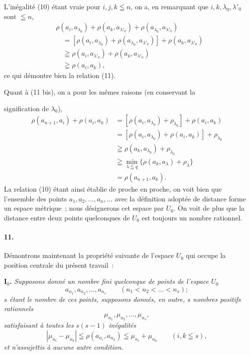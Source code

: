 \documentclass[a4paper,12pt]{amsart}
\newcommand{\srcpage}[1]{} %
\begin{document}
L'inégalité (10) étant vraie pour $i,j,k\leqq n$, on a, en remarquant que $i,k,\lambda_0,\lambda'_0$ sont $\leqq n$,
\begin{equation}\tag{13}
\begin{aligned}
&\rho(a_i,a_{\lambda_0})+\rho(a_k,a_{\lambda'_0})+\rho(a_{\lambda_0},a_{\lambda'_0})\\
&\quad=[\rho(a_i,a_{\lambda_0})+\rho(a_{\lambda_0},a_{\lambda'_0})]+\rho(a_k,a_{\lambda'_0})\\
&\quad\geqq\rho(a_i,a_{\lambda'_0})+\rho(a_k,a_{\lambda'_0})\\
&\quad\geqq\rho(a_i,a_k),
\end{aligned}
\end{equation}
ce qui démontre bien la relation (11).

Quant à (11 bis), on a pour les mêmes raisons (en conservant la
\srcpage{56}
signification de $\lambda_0$),
\[
\begin{aligned}
\rho(a_{n+1},a_i)+\rho(a_i,a_k)
&=[\rho(a_i,a_{\lambda_0})+\rho_{\lambda_0}]+\rho(a_i,a_k)\\
&=[\rho(a_i,a_{\lambda_0})+\rho(a_i,a_k)]+\rho_{\lambda_0}\\
&\geqq\rho(a_k,a_{\lambda_0})+\rho_{\lambda_0}\\
&\geqq\min_{\lambda\leqq q}\{\rho(a_k,a_\lambda)+\rho_\lambda\}\\
&=\rho(a_{n+1},a_k).
\end{aligned}
\]
La relation (10) étant ainsi établie de proche en proche, on voit bien que l'ensemble des points $a_1,a_2,\dots,a_n,\dots$ avec la définition adoptée de distance forme un espace métrique~; nous désignerons cet espace par $U_0$. On voit de plus que la distance entre deux points quelconques de $U_0$ est toujours un nombre rationnel.

\paragraph{11.}
Démontrons maintenant la propriété suivante de l'espace $U_0$ qui occupe la position centrale du présent travail~:

\textbf{I$_0$.} \textit{Supposons donné un nombre fini quelconque de points de l'espace $U_0$}
\[
a_{n_1},a_{n_2},\dots,a_{n_s}\qquad(n_1<n_2<\dots<n_s);
\]
\textit{$s$ étant le nombre de ces points, supposons donnés, en outre, $s$ nombres positifs rationnels}
\[
\mu_{n_1},\mu_{n_2},\dots,\mu_{n_s},
\]
\textit{satisfaisant à toutes les $s(s-1)$ inégalités}
\begin{equation}\tag{$\Delta^*$}
|\mu_{n_i}-\mu_{n_k}|\leqq\rho(a_{n_i},a_{n_k})\leqq\mu_{n_i}+\mu_{n_k}
\qquad(i,k\leqq s),
\end{equation}
\textit{et n'assujettis à aucune autre condition.}
\end{document}
